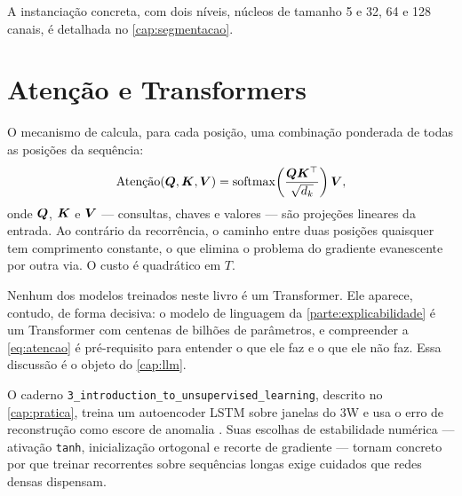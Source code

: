 A instanciação concreta, com dois níveis, núcleos de tamanho 5 e 32, 64 e 128 canais, é
detalhada no \cref{cap:segmentacao}.

\section{Atenção e Transformers}

O mecanismo de  \citep{Vaswani2017} calcula, para cada
posição, uma combinação ponderada de todas as posições da sequência:
\begin{equation}
  \text{Atenção}(\bm{Q}, \bm{K}, \bm{V}) =
  \operatorname{softmax}\!\left( \frac{\bm{Q}\bm{K}^{\top}}{\sqrt{d_k}} \right) \bm{V},
  \label{eq:atencao}
\end{equation}
onde $\bm{Q}$, $\bm{K}$ e $\bm{V}$ --- consultas, chaves e valores --- são projeções
lineares da entrada. Ao contrário da recorrência, o caminho entre duas posições
quaisquer tem comprimento constante, o que elimina o problema do gradiente evanescente
por outra via. O custo é quadrático em $T$.

Nenhum dos modelos treinados neste livro é um Transformer. Ele aparece, contudo, de
forma decisiva: o modelo de linguagem da \cref{parte:explicabilidade} é um Transformer
com centenas de bilhões de parâmetros, e compreender a \cref{eq:atencao} é pré-requisito
para entender o que ele faz e o que ele não faz. Essa discussão é o objeto do
\cref{cap:llm}.

\begin{destaque}[Prática]
O caderno \texttt{3\_introduction\_to\_unsupervised\_learning}, descrito no
\cref{cap:pratica}, treina um autoencoder LSTM sobre janelas do 3W e usa o erro de
reconstrução como escore de anomalia \citep{Lopes2026Intro3W}. Suas escolhas de
estabilidade numérica --- ativação \texttt{tanh}, inicialização ortogonal e recorte de
gradiente --- tornam concreto por que treinar recorrentes sobre sequências longas exige
cuidados que redes densas dispensam.
\end{destaque}


